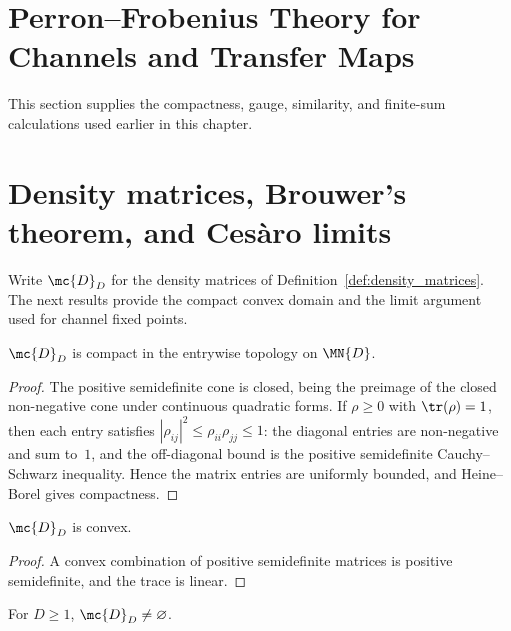\section{Perron--Frobenius Theory for Channels and Transfer Maps}
\label{ch:qpf_supporting_results}
This section supplies the compactness, gauge, similarity, and finite-sum
calculations used earlier in this chapter.

\section{Density matrices, Brouwer's theorem, and Ces\`aro limits}
\label{sec:app_qpf_density}

Write $\mc{D}_D$ for the density matrices of
Definition~\ref{def:density_matrices}. The next results provide the compact
convex domain and the limit argument used for channel fixed points.

\begin{theorem}\label{thm:density_compact}
    \leanok
    $\mc{D}_D$ is compact in the entrywise topology on $\MN{D}$.
\end{theorem}

\begin{proof}
    \leanok
    The positive semidefinite cone is closed, being the preimage of the closed
    non-negative cone under continuous quadratic forms. If $\rho \ge 0$ with
    $\tr(\rho) = 1$, then each entry satisfies
    $|\rho_{ij}|^2 \le \rho_{ii}\rho_{jj} \le 1$: the diagonal entries are
    non-negative and sum to~$1$, and the off-diagonal bound is the positive
    semidefinite Cauchy--Schwarz inequality. Hence the matrix entries are
    uniformly bounded, and Heine--Borel gives compactness.
\end{proof}

\begin{theorem}\label{thm:density_convex}
    \leanok
    $\mc{D}_D$ is convex.
\end{theorem}

\begin{proof}\leanok
    A convex combination of positive semidefinite matrices is positive
    semidefinite, and the trace is linear.
\end{proof}

\begin{theorem}\label{thm:density_nonempty}
    \leanok
    For $D \ge 1$, $\mc{D}_D \neq \varnothing$.
\end{theorem}


